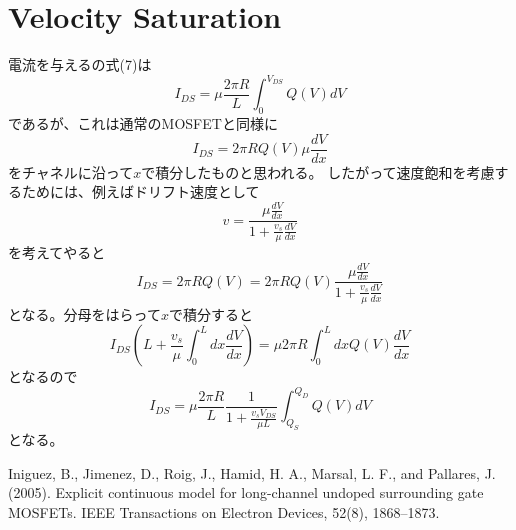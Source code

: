 \documentclass[11pt,uplatex,a4paper]{jsarticle}
\def\d#1#2{\frac{d #1}{d #2}}
\begin{document}
\section{Velocity Saturation}
電流を与える\cite{Iniguez:2005ub}の式(7)は
\begin{equation}
 I_{DS} = \mu \frac{2 \pi R}{L}\int_0^{V_{DS}} Q(V) dV
\end{equation}
であるが、これは通常のMOSFETと同様に
\begin{equation}
 I_{DS} = 2 \pi R Q(V) \mu \d{V}{x}
\end{equation}
をチャネルに沿って$x$で積分したものと思われる。
したがって速度飽和を考慮するためには、例えばドリフト速度として
\begin{equation}
 v = \frac{\mu \d{V}{x}}{1+\frac{v_s}{\mu}\d{V}{x}}
\end{equation}
を考えてやると
\begin{equation}
 I_{DS} = 2 \pi R Q(V)  = 2 \pi R Q(V) \frac{\mu \d{V}{x}}{1+\frac{v_s}{\mu}\d{V}{x}}
\end{equation}
となる。分母をはらって$x$で積分すると
\begin{equation}
 I_{DS} (L +  \frac{v_s}{\mu} \int_0^{L} dx \d{V}{x})
  = \mu 2 \pi R \int_0^{L} dx Q(V) \d{V}{x}
\end{equation}
となるので
\begin{equation}
 I_{DS} = \mu \frac{2 \pi R}{L} \frac{1}{{1 + \frac{v_s V_{DS}}{\mu L}}}
  \int_{Q_S}^{Q_D} Q(V) dV
\end{equation}
となる。

\appendix

 \begin{thebibliography}{99}
		  Iniguez, B., Jimenez, D., Roig, J., Hamid, H. A., Marsal, L. F., and Pallares, J. (2005). Explicit continuous model for long-channel undoped surrounding gate MOSFETs. IEEE Transactions on Electron Devices, 52(8), 1868–1873.     
 \end{thebibliography}
\end{document}
